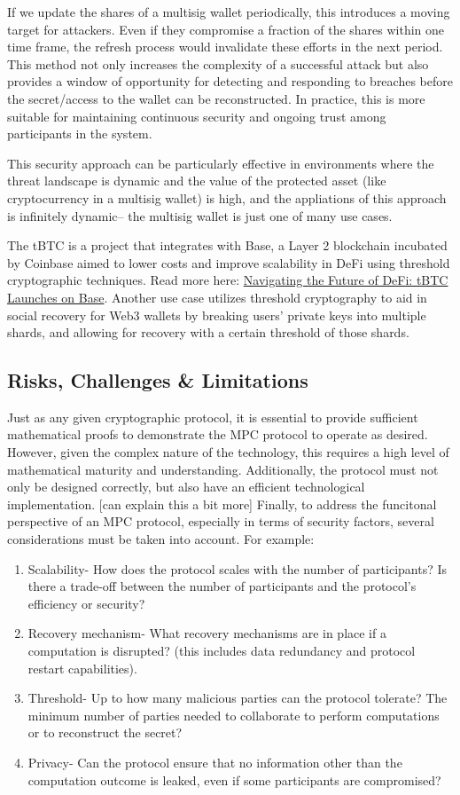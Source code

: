 \documentclass[12pt]{article}
\begin{document}
If we update the shares of a multisig wallet periodically, this introduces a moving target for attackers. Even if they compromise a fraction of the shares within one time frame, the refresh process would invalidate these efforts in the next period. This method not only increases the complexity of a successful attack but also provides a window of opportunity for detecting and responding to breaches before the secret/access to the wallet can be reconstructed. In practice, this is more suitable for maintaining continuous security and ongoing trust among participants in the system.

This security approach can be particularly effective in environments where the threat landscape is dynamic and the value of the protected asset (like cryptocurrency in a multisig wallet) is high, and the appliations of this approach is infinitely dynamic-- the multisig wallet is just one of many use cases.

The tBTC is a project that integrates with Base, a Layer 2 blockchain incubated by Coinbase aimed to lower costs and improve scalability in DeFi using threshold cryptographic techniques. Read more here: \href{https://blog.threshold.network/navigating-the-future-of-defi-tbtc-launches-on-base/}{Navigating the Future of DeFi: tBTC Launches on Base}. Another use case utilizes threshold cryptography to aid in social recovery for Web3 wallets by breaking users' private keys into multiple shards, and allowing for recovery with a certain threshold of those shards. 

\subsection{Risks, Challenges \& Limitations}
Just as any given cryptographic protocol, it is essential to provide sufficient mathematical proofs to demonstrate the MPC protocol to operate as desired. However, given the complex nature of the technology, this requires a high level of mathematical maturity and understanding. Additionally, the protocol must not only be designed correctly, but also have an efficient technological implementation. [can explain this a bit more] Finally, to address the funcitonal perspective of an MPC protocol, especially in terms of security factors, several considerations must be taken into account. For example:
\begin{enumerate}
    \item Scalability- How does the protocol scales with the number of participants? Is there a trade-off between the number of participants and the protocol's efficiency or security?
    \item Recovery mechanism- What recovery mechanisms are in place if a computation is disrupted? (this includes data redundancy and protocol restart capabilities).
    \item Threshold- Up to how many malicious parties can the protocol tolerate? The minimum number of parties needed to collaborate to perform computations or to reconstruct the secret?
    \item Privacy- Can the protocol ensure that no information other than the computation outcome is leaked, even if some participants are compromised?
\end{enumerate}
\end{document}
